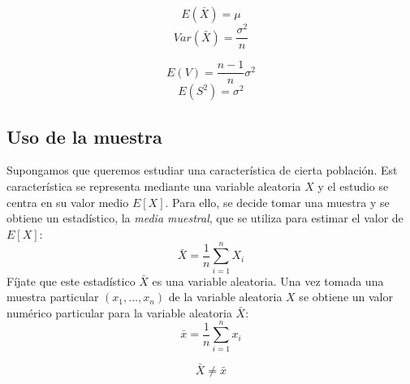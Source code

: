 \documentclass[
  letterpaper,
  DIV=11,
  numbers=noendperiod]{scrreprt}
\begin{document}
\[
E(\bar{X})=\mu
\] \[
Var(\bar{X})=\frac{\sigma^2}{n}
\]

\[
E(V)=\frac{n-1}{n}\sigma^2
\] \[
E(S^2)=\sigma^2
\]

\hypertarget{uso-de-la-muestra}{%
\subsection{Uso de la muestra}\label{uso-de-la-muestra}}

Supongamos que queremos estudiar una característica de cierta población.
Est característica se representa mediante una variable aleatoria \(X\) y
el estudio se centra en su valor medio \(E[X]\). Para ello, se decide
tomar una muestra y se obtiene un estadístico, la \emph{media muestral},
que se utiliza para estimar el valor de \(E[X]\): \[
\bar{X}=\frac{1}{n}\sum_{i=1}^nX_i
\] Fíjate que este estadístico \(\bar{X}\) es una variable aleatoria.
Una vez tomada una muestra particular \((x_1,\ldots,x_n)\) de la
variable aleatoria \(X\) se obtiene un valor numérico particular para la
variable aleatoria \(\bar{X}\): \[
\bar{x}=\frac{1}{n}\sum_{i=1}^nx_i
\]

\begin{tcolorbox}[enhanced jigsaw, arc=.35mm, breakable, coltitle=black, left=2mm, opacityback=0, bottomtitle=1mm, colbacktitle=quarto-callout-important-color!10!white, title=\textcolor{quarto-callout-important-color}{\faExclamation}\hspace{0.5em}{Para recordar}, titlerule=0mm, colback=white, colframe=quarto-callout-important-color-frame, bottomrule=.15mm, rightrule=.15mm, opacitybacktitle=0.6, toptitle=1mm, toprule=.15mm, leftrule=.75mm]

\[\bar{X}\neq\bar{x}\]

\end{tcolorbox}
\end{document}
